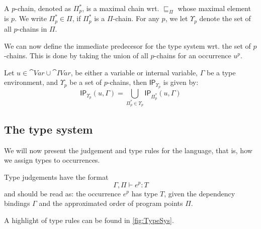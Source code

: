 \documentclass{llncs}
\newcommand{\sqleq}{\ensuremath{\sqsubseteq\xspace}}
\newcommand{\IP}{\ensuremath{\textsf{IP}}\xspace}
\begin{document}

\begin{definition}[$p$-chains]
  A $p$-chain, denoted as $\Pi_p^{*}$, is a maximal chain
  wrt. $\sqleq_\Pi$ whose maximal element is $p$. We write
  $\Pi_p^{*}\in\Pi$, if $\Pi_p^{*}$ is a $\Pi$-chain. For any $p$, we
  let $\Upsilon_p$ denote the set of all $p$-chains in $\Pi$.
\end{definition}


We can now define the immediate predecesor for the type system wrt. the set of $p$-chains.
This is done by taking the union of all $p$-chains for an occurrence $u^p$.

\begin{definition}\label{def:GBindUps}
	Let $u\in \cat{Var}\cup\cat{IVar}$, be either a variable or internal variable, $\Gamma$ be a type environment, and $\Upsilon_p$ be a set of $p$-chains, then $\IP_{\Upsilon_p}$ is given by:
\[
  \IP_{\Upsilon_p}(u,\Gamma)=\bigcup_{\Pi_p^{*}\in\Upsilon_p}\IP_{\Pi_p^{*}}(u,\Gamma) \]
\end{definition}



\subsection{The type system}\label{sec:Judge}
We will now present the judgement and type rules for the language, that is, how we assign types to occurrences.

Type judgements have the format
%
\[ \Gamma,\Pi\vdash e^p: T \]
%
and should be read as: the occurrence $e^p$ has type $T$, given the
dependency bindings $\Gamma$ and the approximated order of program
points $\Pi$. 

A highlight of type rules can be found in \cref{fig:TypeSys}.
\end{document}
